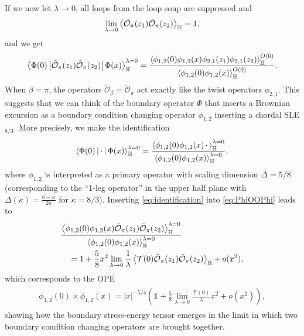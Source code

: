 \documentclass[a4paper,11pt]{article}
\begin{document}
If we now let $\lambda \to 0$, all loops from the loop soup are suppressed and
\begin{align}
\begin{split}
    \lim_{\lambda \to 0} \Braket{\tilde{\mathcal{O}}_{\pi}(z_1) \tilde{\mathcal{O}}_{\pi}(z_2)}_{\mathbb{H}} = 1,
\end{split}
\end{align}
and we get
\begin{align}
\begin{split}
    \Braket{\Phi(0) \left\vert \tilde{\mathcal{O}}_{\pi}(z_1) \tilde{\mathcal{O}}_{\pi}(z_2) \right\vert \Phi(x)}_{\mathbb{H}}^{\lambda=0} = \frac{\Braket{\phi_{1,2}(0) \phi_{1,2}(x) \phi_{2,1}(z_1) \phi_{2,1}(z_2)}^{O(0)}_{\mathbb{H}}}{\Braket{\phi_{1,2}(0) \phi_{1,2}(x)}^{O(0)}_{\mathbb{H}}}.
\end{split}
\end{align}
When $\beta=\pi$, the operators $\tilde{\mathcal{O}}_{\beta}=\tilde{\mathcal{O}}_{\pi}$ act exactly like the twist operators $\phi_{2,1}$. This suggests that we can think of the boundary operator $\Phi$ that inserts a Brownian excursion as a boundary condition changing operator $\phi_{1,2}$ inserting a chordal SLE$_{8/3}$.
More precisely, we make the identification
\begin{align} \label{eq:identification}
\begin{split}
    \Braket{\Phi(0) \left\vert \, \cdot \, \right\vert \Phi(x)}^{\lambda=0}_{\mathbb{H}} = \frac{\Braket{\phi_{1,2}(0) \phi_{1,2}(x) \, \cdot \,}^{\lambda=0}_{\mathbb{H}}}{\Braket{\phi_{1,2}(0) \phi_{1,2}(x)}^{\lambda=0}_{\mathbb{H}}},
\end{split}
\end{align}
where $\phi_{1,2}$ is interpreted as a primary operator with scaling dimension $\Delta=5/8$ (corresponding to the ``1-leg operator'' in the upper half plane with $\Delta(\kappa)=\frac{6-\kappa}{2\kappa}$ for $\kappa=8/3$). Inserting \eqref{eq:identification} into \eqref{eq:PhiOOPhi} leads to
\begin{align}
\begin{split} \label{eq:phiphiOO}
    & \frac{\Braket{\phi_{1,2}(0) \phi_{1,2}(x) \tilde{\mathcal{O}}_{\pi}(z_1) \tilde{\mathcal{O}}_{\pi}(z_2)}^{\lambda=0}_{\mathbb{H}}}{\Braket{\phi_{1,2}(0) \phi_{1,2}(x)}^{\lambda=0}_{\mathbb{H}}} \\
    & \quad = 1 + \frac{5}{8} x^2 \lim_{\lambda \to 0}\frac{1}{\lambda} \Braket{ \mathcal{T}(0) \tilde{\mathcal{O}}_{\pi}(z_1) \tilde{\mathcal{O}}_{\pi}(z_2) }_{\mathbb{H}} + o(x^2),
\end{split}
\end{align}
which corresponds to the OPE
\begin{align}
\begin{split} \label{eq:OPEphiphi}
    \phi_{1,2}(0) \times \phi_{1,2}(x) = \lvert x \rvert^{-5/4} \left( \mathbb{1} + \frac{5}{8} \lim_{\lambda \to 0}\frac{\mathcal{T}(0)}{\lambda} x^2 + o(x^2) \right),
\end{split}
\end{align}
showing how the boundary stress-energy tensor emerges in the limit in which two boundary condition changing operators are brought together.
\end{document}
